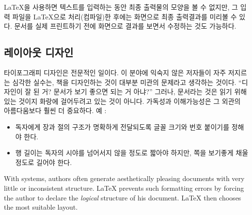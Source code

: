 \LaTeX{}을 사용하면 텍스트를 입력하는 동안 최종 출력물의 모양을 볼 수 없지만,
그 입력 파일을 \LaTeX{}으로 처리(컴파일)한
후에는 화면으로 최종 출력결과를 미리볼 수 있다. 문서를 실제
프린트하기 전에 화면으로 결과를 보면서 수정하는 것도 가능하다.

\subsection{레이아웃 디자인}

타이포그래피 디자인은 전문적인 일이다. 이 분야에 익숙지 않은 저자들이
자주 저지르는 심각한 실수는, 책을 디자인하는 것이 대부분 미관의 문제라고
생각하는 것이다. ``디자인이 잘 된 거? 문서가 보기 좋으면 되는 거 아냐?''
그러나, 문서라는 것은 읽기 위해 있는 것이지 화랑에 걸어두려고 있는 것이
아니다. 가독성과 이해가능성은 그 외관의 아름다움보다 훨씬 더 중요하다.
예 :
\begin{itemize}
\item 독자에게 장과 절의 구조가 명확하게 전달되도록   글꼴 크기와 번호 붙이기를 정해야 한다.
\item 행 길이는 독자의 시야를 넘어서지 않을 정도로 짧아야 하지만,
   쪽을 보기좋게 채울 정도로 길어야 한다. 

\end{itemize}

With  systems, authors often generate aesthetically
pleasing documents with very little or inconsistent structure.
\LaTeX{} prevents such formatting errors by forcing the author to
declare the \emph{logical} structure of his document. \LaTeX{} then
chooses the most suitable layout.

